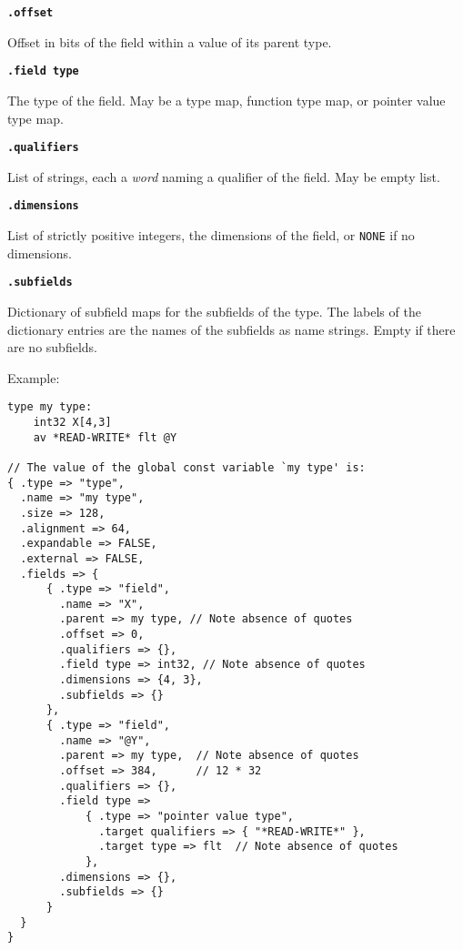 \documentclass[12pt]{article}
\newcommand{\ttkey}[1]{{\tt \bfseries #1}}
\newenvironment{indpar}[1][0.3in]%
	{\begin{list}{}%
		     {\setlength{\itemsep}{0in}%
		      \setlength{\topsep}{0in}%
		      \setlength{\parsep}{1ex}%
		      \setlength{\labelwidth}{#1}%
		      \setlength{\leftmargin}{#1}%
		      \addtolength{\leftmargin}{\labelsep}}%
	 \item}%
	{\end{list}}
\begin{document}
\ttkey{.offset}
\begin{indpar}
Offset in bits of the field within a value of its parent type.
\end{indpar}

\ttkey{.field type}
\begin{indpar}
The type of the field.  May be a type map, function type map,
or pointer value type map.
\end{indpar}

\ttkey{.qualifiers}
\begin{indpar}
List of strings, each a {\em word} naming a qualifier
of the field.  May be empty list.
\end{indpar}

\ttkey{.dimensions}
\begin{indpar}
List of strictly positive integers, the dimensions of the field, or {\tt NONE}
if no dimensions.
\end{indpar}

\ttkey{.subfields}
\begin{indpar}
Dictionary of subfield maps for the subfields of the type.  The labels
of the dictionary entries are the names of the subfields as name strings.
Empty if there are no subfields.
\end{indpar}

Example:
\begin{indpar}\begin{verbatim}
type my type:
    int32 X[4,3]
    av *READ-WRITE* flt @Y

// The value of the global const variable `my type' is:
{ .type => "type",
  .name => "my type",
  .size => 128,
  .alignment => 64,
  .expandable => FALSE,
  .external => FALSE,
  .fields => {
      { .type => "field",
        .name => "X",
        .parent => my type, // Note absence of quotes
        .offset => 0,
        .qualifiers => {},
        .field type => int32, // Note absence of quotes
        .dimensions => {4, 3},
        .subfields => {}
      },
      { .type => "field",
        .name => "@Y",
        .parent => my type,  // Note absence of quotes
        .offset => 384,      // 12 * 32
        .qualifiers => {},
        .field type =>
            { .type => "pointer value type",
              .target qualifiers => { "*READ-WRITE*" },
              .target type => flt  // Note absence of quotes
            },
        .dimensions => {},
        .subfields => {}
      }
  }
}

\end{verbatim}\end{indpar}
\end{document}
